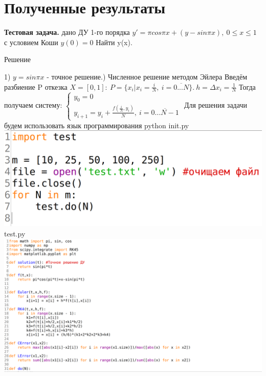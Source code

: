 \documentclass[a4paper,14pt]{article}
\begin{document}
\section{Полученные результаты}
\indent\textbf{Тестовая задача.} дано ДУ 1-го порядка $y'=\pi cos\pi x+(y-sin \pi x),\ 0\leq x \leq 1$ с условием Коши $y(0)=0$\newline
Найти y(x).
\begin{center}Решение\end{center}
1) $y = sin\pi x$ - точное решение.) Численное решение методом Эйлера\newline
Введём разбиение P откезка $X=[0,1]:\ P=\{x_i|x_i=\frac{i}{N},\ i=\overline{0...N}\}.\ h=\Delta x_i=\frac{1}{N}$\newline
Тогда получаем систему:\newline
$
\begin{cases}
  y_0=0 \\
  y_{i+1}=y_i+\frac{f(\frac{i}{N},y_i)}{N},\ i=\overline{0...N-1}
\end{cases}
$\newline
Для решения задачи будем использовать язык программирования python\newline
init.py\newline
\includegraphics[scale=0.20]{images/code/example init.png}
test.py\newline
\includegraphics[scale=0.20]{images/code/example test 1.png}
\end{document}
